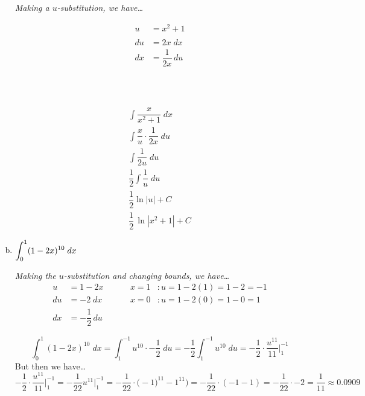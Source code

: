 \documentclass[12pt,letterpaper]{exam}
\begin{document}
\begin{questions}
\begin{enumerate}[(a)]
	{\itshape Making a $u$-substitution, we have\dots \par
	\begin{minipage}[b]{0.3\textwidth}
		\[
		\begin{aligned}
		u&= x^2 + 1 \\
		\\
		du&= 2x \;dx \\
		dx&= \dfrac{1}{2x} \, du
		\\ \\ \\ \\ \\ \\ \\ \\
		\end{aligned}
		\]
	\end{minipage}\begin{minipage}[b]{0.3\textwidth}
		\[
		\begin{gathered}
		\int \dfrac{x}{x^2 + 1} \;dx \\[0.2cm]
		\int \dfrac{x}{u} \cdot \dfrac{1}{2x} \; du \\[0.2cm]
		\int \dfrac{1}{2u} \;du \\[0.2cm]
		\dfrac{1}{2} \int \dfrac{1}{u} \;du \\[0.2cm]
		\dfrac{1}{2} \ln|u| + C \\[0.2cm]
		\dfrac{1}{2} \, \ln|x^2 + 1| + C
		\end{gathered}
		\]
	\end{minipage}
	} \pvspace{1.1cm}
	
	\item $\displaystyle\int_0^1 (1 - 2x)^{10} \;dx$ \pspace

	{\itshape Making the $u$-substitution and changing bounds, we have\dots
		\[
		\begin{aligned}
		u&= 1 - 2x \hspace{1cm}& x=1 &\colon u= 1 - 2(1)= 1 - 2= -1 \\
		du&= -2 \;dx \hspace{1cm}& x= 0 &\colon u= 1 - 2(0)= 1 - 0= 1 \\
		dx&= -\dfrac{1}{2} \, du
		\end{aligned}
		\]

		\[
		\int_0^1 (1 - 2x)^{10} \;dx= \int_1^{-1} u^{10} \cdot -\dfrac{1}{2} \; du= -\dfrac{1}{2} \int_1^{-1} u^{10} \;du= -\dfrac{1}{2} \cdot \dfrac{u^{11}}{11} \bigg|_1^{-1}
		\]
	But then we have\dots
		\[
		-\dfrac{1}{2} \cdot \dfrac{u^{11}}{11} \bigg|_1^{-1}= -\dfrac{1}{22} u^{11} \bigg|_1^{-1}= -\dfrac{1}{22} \cdot \big (-1)^{11} - 1^{11} \big)= -\dfrac{1}{22} \cdot (-1 - 1)= -\dfrac{1}{22} \cdot -2= \dfrac{1}{11} \approx 0.0909
		\]
	}
	\end{enumerate}
\end{questions}
\end{document}
